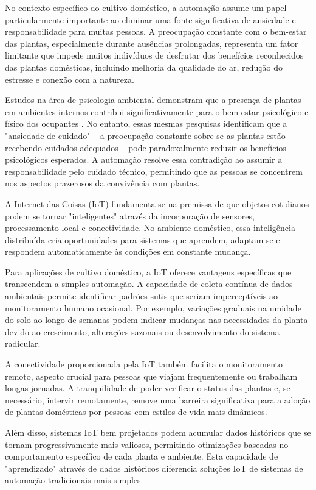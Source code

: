\documentclass[twoside,english,brazilian]{UNISINOSmonografia}
\begin{document}
No contexto específico do cultivo doméstico, a automação assume um papel particularmente importante ao eliminar uma fonte significativa de ansiedade e responsabilidade para muitas pessoas. A preocupação constante com o bem-estar das plantas, especialmente durante ausências prolongadas, representa um fator limitante que impede muitos indivíduos de desfrutar dos benefícios reconhecidos das plantas domésticas, incluindo melhoria da qualidade do ar, redução do estresse e conexão com a natureza.

Estudos na área de psicologia ambiental demonstram que a presença de plantas em ambientes internos contribui significativamente para o bem-estar psicológico e físico dos ocupantes \cite{fbi2025_smart_home_sa}. No entanto, essas mesmas pesquisas identificam que a "ansiedade de cuidado" – a preocupação constante sobre se as plantas estão recebendo cuidados adequados – pode paradoxalmente reduzir os benefícios psicológicos esperados. A automação resolve essa contradição ao assumir a responsabilidade pelo cuidado técnico, permitindo que as pessoas se concentrem nos aspectos prazerosos da convivência com plantas.

A Internet das Coisas (IoT) fundamenta-se na premissa de que objetos cotidianos podem se tornar "inteligentes" através da incorporação de sensores, processamento local e conectividade. No ambiente doméstico, essa inteligência distribuída cria oportunidades para sistemas que aprendem, adaptam-se e respondem automaticamente às condições em constante mudança.

Para aplicações de cultivo doméstico, a IoT oferece vantagens específicas que transcendem a simples automação. A capacidade de coleta contínua de dados ambientais permite identificar padrões sutis que seriam imperceptíveis ao monitoramento humano ocasional. Por exemplo, variações graduais na umidade do solo ao longo de semanas podem indicar mudanças nas necessidades da planta devido ao crescimento, alterações sazonais ou desenvolvimento do sistema radicular.

A conectividade proporcionada pela IoT também facilita o monitoramento remoto, aspecto crucial para pessoas que viajam frequentemente ou trabalham longas jornadas. A tranquilidade de poder verificar o status das plantas e, se necessário, intervir remotamente, remove uma barreira significativa para a adoção de plantas domésticas por pessoas com estilos de vida mais dinâmicos.

Além disso, sistemas IoT bem projetados podem acumular dados históricos que se tornam progressivamente mais valiosos, permitindo otimizações baseadas no comportamento específico de cada planta e ambiente. Esta capacidade de "aprendizado" através de dados históricos diferencia soluções IoT de sistemas de automação tradicionais mais simples.
\end{document}
